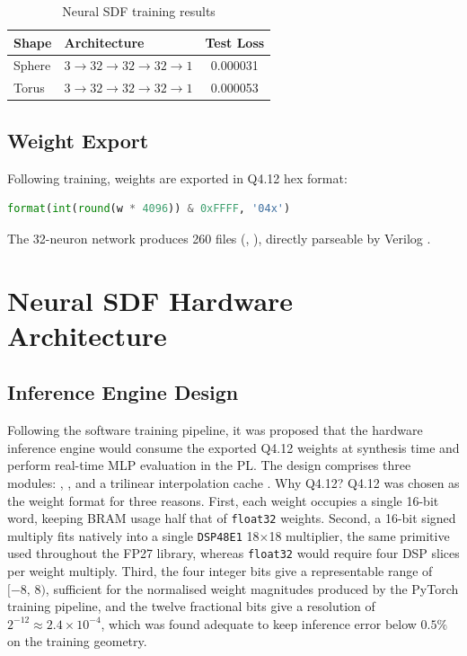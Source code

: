 \begin{table}[htbp]
\centering
\small
\caption{Neural SDF training results}
\label{tab:neural_results}
{\renewcommand{\arraystretch}{1.3}
\begin{tabular}{llc}
\toprule
\textbf{Shape} & \textbf{Architecture} & \textbf{Test Loss} \\
\midrule
Sphere    & $3\to32\to32\to32\to1$ & 0.000031 \\
Torus     & $3\to32\to32\to32\to1$ & 0.000053 \\
\bottomrule
\end{tabular}}
\end{table}

\FloatBarrier

\subsection{Weight Export}

Following training, weights are exported in Q4.12 hex format:
\begin{lstlisting}[language=Python]
format(int(round(w * 4096)) & 0xFFFF, '04x')
\end{lstlisting}
The 32-neuron network produces 260 files (,
), directly parseable by Verilog
.


\section{Neural SDF Hardware Architecture}
\label{sec:neural_hw}

\subsection{Inference Engine Design}

Following the software training pipeline, it was proposed that the hardware inference
engine would consume the exported Q4.12 weights at synthesis time and
perform real-time MLP evaluation in the PL. The design comprises three modules:
, , and a trilinear interpolation cache
.
Why Q4.12? 
Q4.12 was chosen as the weight format for three reasons.
First, each weight occupies a single 16-bit word, keeping BRAM usage half
that of \texttt{float32} weights.
Second, a 16-bit signed multiply fits natively into a single \texttt{DSP48E1}
18$\times$18 multiplier, the same primitive used throughout the FP27
library, whereas \texttt{float32} would require four DSP slices per weight
multiply.
Third, the four integer bits give a representable range of $[-8,\,8)$,
sufficient for the normalised weight magnitudes produced by the PyTorch
training pipeline, and the twelve fractional bits give a resolution of
$2^{-12}\approx2.4\times10^{-4}$, which was found adequate to keep inference
error below $0.5\%$ on the training geometry.

